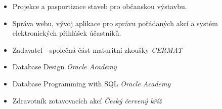 \documentclass[10pt,a4paper,ragged2e]{altacv}
\begin{document}
\divider

\begin{itemize}
\item Projekce a pasportizace staveb pro občanskou výstavbu.
\end{itemize}

\divider

\begin{itemize}
\item Správa webu, vývoj aplikace pro správu pořádaných akcí a systém elektronických přihlášek účastníků.

\end{itemize}


\smallskip
\begin{itemize}
\smallskip
\item Zadavatel - společná část maturitní zkoušky \textit{CERMAT}
\smallskip
\item Database Design \textit{Oracle Academy}
\smallskip
\item Database Programming with SQL \textit{Oracle Academy}
\smallskip
\item Zdravotník zotavovacích akcí \textit{Český červený kříž}
\end{itemize}






\end{document}
